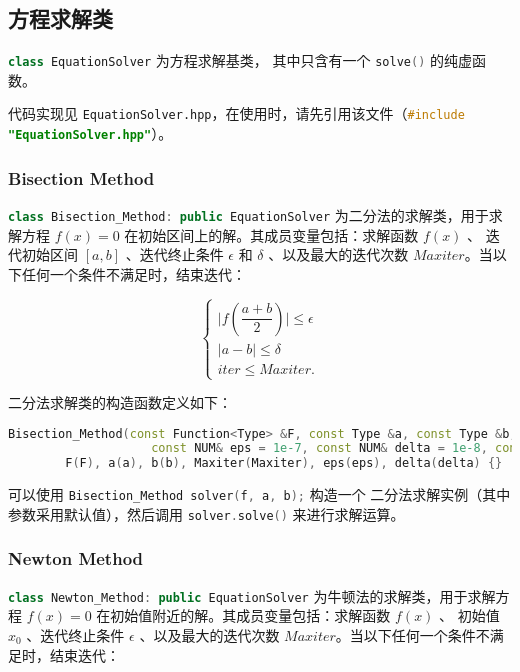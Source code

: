 \documentclass[lang=cn,a4paper,newtx,bibend=bibtex]{elegantpaper}
\begin{document}
\subsection{方程求解类}

\lstinline[language=C++]{class EquationSolver} 为方程求解基类，
其中只含有一个 \lstinline[language=C++]{solve()} 的纯虚函数。

代码实现见 \lstinline{EquationSolver.hpp}，在使用时，请先引用该文件（\lstinline[language=C++]{#include "EquationSolver.hpp"}）。

\subsubsection{Bisection Method}

\lstinline[language=C++]{class Bisection_Method: public EquationSolver}
为二分法的求解类，用于求解方程 $f(x) = 0$ 在初始区间上的解。其成员变量包括：求解函数 $f(x)$ 、
迭代初始区间 $[a,b]$ 、迭代终止条件 $\epsilon$ 和 $\delta$ 、以及最大的迭代次数
$Maxiter$。当以下任何一个条件不满足时，结束迭代：

\begin{equation*}
  \begin{cases}
    \vert f(\dfrac{a+b}{2})\vert \le \epsilon \\
    \vert a - b\vert \le \delta \\
    iter \le Maxiter.
  \end{cases}
\end{equation*}

二分法求解类的构造函数定义如下：

\begin{lstlisting}[language=C++]
  Bisection_Method(const Function<Type> &F, const Type &a, const Type &b, 
                    const NUM& eps = 1e-7, const NUM& delta = 1e-8, const int& Maxiter = 50) :
        F(F), a(a), b(b), Maxiter(Maxiter), eps(eps), delta(delta) {}
\end{lstlisting}

可以使用 \lstinline[language=C++]{Bisection_Method solver(f, a, b);} 构造一个
二分法求解实例（其中参数采用默认值），然后调用 \lstinline[language=C++]{solver.solve()} 来进行求解运算。 

\subsubsection{Newton Method}

\lstinline[language=C++]{class Newton_Method: public EquationSolver}
为牛顿法的求解类，用于求解方程 $f(x) = 0$ 在初始值附近的解。其成员变量包括：求解函数 $f(x)$ 、
初始值 $x_0$ 、迭代终止条件 $\epsilon$ 、以及最大的迭代次数
$Maxiter$。当以下任何一个条件不满足时，结束迭代：
\end{document}
